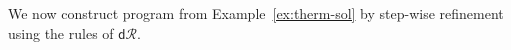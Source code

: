 \documentclass[envcountsame,envcountsect]{llncs}
\newcommand{\dR}{\mathsf{d}\mathcal{R}}
\begin{document}
\begin{example}\label{ex:therm-rsol}
  We now construct program  from Example~\ref{ex:therm-sol}
  by step-wise refinement using the rules of $\dR$. 


\end{example}
\end{document}
